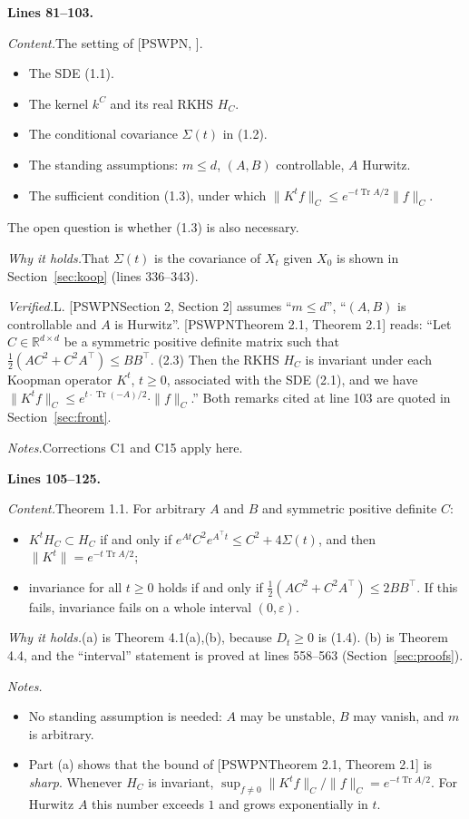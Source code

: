 \documentclass[11pt]{amsart}
\newcommand{\R}{\mathbb{R}}
\newcommand{\Tr}{\operatorname{Tr}}
\newcommand{\tp}{\top}
\newcommand{\src}[1]{\par\bigskip\noindent\textbf{Lines #1.}\enspace}
\newcommand{\content}{\par\smallskip\noindent\textit{Content.}\enspace}
\newcommand{\why}{\par\smallskip\noindent\textit{Why it holds.}\enspace}
\newcommand{\verified}{\par\smallskip\noindent\textit{Verified.}\enspace}
\newcommand{\notes}{\par\smallskip\noindent\textit{Notes.}\enspace}
\newcommand{\tL}{\textsf{L}}
\newcommand{\PS}[1][]{[PSWPN\ifx\relax#1\relax\else, #1\fi]}
\begin{document}
\src{81--103}
\content The setting of \PS.
\begin{itemize}
\item The SDE (1.1).
\item The kernel $k^C$ and its real RKHS $H_C$.
\item The conditional covariance $\Sigma(t)$ in (1.2).
\item The standing assumptions: $m\le d$, $(A,B)$ controllable, $A$ Hurwitz.
\item The sufficient condition (1.3), under which $\|K^tf\|_C\le e^{-t\Tr A/2}\|f\|_C$.
\end{itemize}
The open question is whether (1.3) is also necessary.
\why That $\Sigma(t)$ is the covariance of $X_t$ given $X_0$ is shown in Section~\ref{sec:koop} (lines 336--343).
\verified \tL. \PS[Section 2] assumes ``$m\le d$'', ``$(A,B)$ is controllable and $A$ is Hurwitz''.
\PS[Theorem 2.1] reads: ``Let $C\in\R^{d\times d}$ be a symmetric positive definite matrix such that
$\frac12(AC^2+C^2A^\top)\le BB^\top$. (2.3) Then the RKHS $H_C$ is invariant under each Koopman operator $K^t$,
$t\ge0$, associated with the SDE (2.1), and we have $\|K^tf\|_C\le e^{t\cdot\Tr(-A)/2}\cdot\|f\|_C$.'' Both remarks
cited at line 103 are quoted in Section~\ref{sec:front}.
\notes Corrections C1 and C15 apply here.

\src{105--125}
\content Theorem 1.1. For arbitrary $A$ and $B$ and symmetric positive definite $C$:
\begin{itemize}
\item[(a)] $K^tH_C\subset H_C$ if and only if $e^{At}C^2e^{A^\tp t}\le C^2+4\Sigma(t)$, and then
$\|K^t\|=e^{-t\Tr A/2}$;
\item[(b)] invariance for all $t\ge0$ holds if and only if $\frac12(AC^2+C^2A^\tp)\le2BB^\tp$. If this fails,
invariance fails on a whole interval $(0,\varepsilon)$.
\end{itemize}
\why (a) is Theorem 4.1(a),(b), because $D_t\ge0$ is (1.4). (b) is Theorem 4.4, and the ``interval'' statement is
proved at lines 558--563 (Section~\ref{sec:proofs}).
\notes
\begin{itemize}
\item No standing assumption is needed: $A$ may be unstable, $B$ may vanish, and $m$ is arbitrary.
\item Part (a) shows that the bound of \PS[Theorem 2.1] is \emph{sharp}. Whenever $H_C$ is invariant,
$\sup_{f\ne0}\|K^tf\|_C/\|f\|_C=e^{-t\Tr A/2}$. For Hurwitz $A$ this number exceeds $1$ and grows exponentially in $t$.
\end{itemize}
\end{document}

